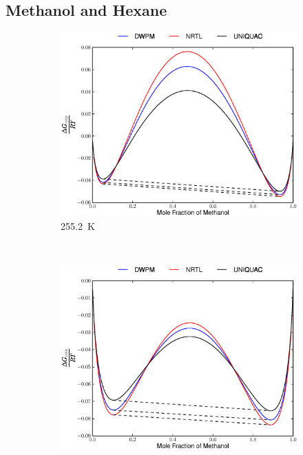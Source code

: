 
\subsection{Methanol and Hexane}
\vspace*{\fill}
\begin{figure}[hp]
\begin{subfigure}[h]{0.5\textwidth}
\centering
\includegraphics[width = \textwidth]{Results_Parts/BinaryParams/methanol-hexane/AllModelsGibbsPlots/T_255.2.eps}
\caption{255.2~$\mathrm{K}$} \label{methanol-hexane255}
\end{subfigure}%
~%
\begin{subfigure}[h]{0.5\textwidth}
\centering
\includegraphics[width = \textwidth]{Results_Parts/BinaryParams/methanol-hexane/AllModelsGibbsPlots/T_278.0.eps}

\end{subfigure}
\end{figure}
